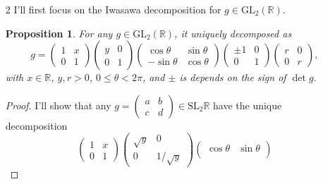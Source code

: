 \documentclass[a4paper, 12pt]{article}
\theoremstyle{Mydefinition}
\theoremstyle{Mytheorem}
\newtheorem{proposition}[statement]{Proposition}
\begin{document}
\begin{enumerate}
    \item[2] I'll first focus on the Iwasawa decomposition for $g\in \textrm{GL}_2(\mathbb{R})$.
    \begin{proposition}
    For any $g\in \textrm{GL}_2(\mathbb{R})$, it uniquely decomposed as
    \begin{equation}\label{HW8:2_1}
        g=\begin{pmatrix}
            1 & x\\
            0 & 1
        \end{pmatrix}
        \begin{pmatrix}
            y & 0\\
            0 & 1
        \end{pmatrix}
        \begin{pmatrix}
            \cos\theta & \sin\theta \\
            -\sin\theta & \cos \theta
        \end{pmatrix}
        \begin{pmatrix}
            \pm 1 & 0\\
            0 & 1
        \end{pmatrix}
        \begin{pmatrix}
            r & 0\\
            0 & r
        \end{pmatrix},
    \end{equation}
    with $x\in \mathbb{R}$, $y,r>0$, $0\leq \theta<2\pi$, and $\pm$ is depends on the sign of $\det g$.
    \end{proposition}
    \begin{proof}
    I'll show that any $g=\begin{pmatrix}
        a & b\\ c & d
    \end{pmatrix}\in \mathrm{SL}_2\mathbb{R}$ have the unique decomposition
    \begin{equation}
    \begin{pmatrix}
                1 & x\\
                0 & 1
            \end{pmatrix}
            \begin{pmatrix}
                \sqrt{y} & 0\\
                0 & 1/\sqrt{y}
            \end{pmatrix}
            \begin{pmatrix}
                \cos\theta & \sin\theta \\

\end{pmatrix}
\end{equation}
\end{proof}
\end{enumerate}
\end{document}
